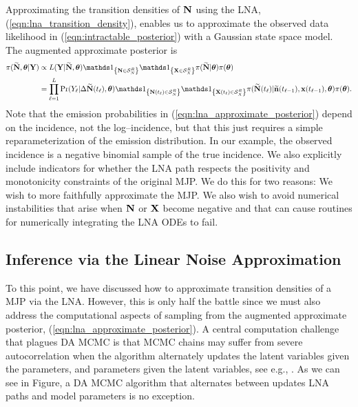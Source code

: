 Approximating the transition densities of $ \mathbf{N} $ using the LNA, (\ref{eqn:lna_transition_density}), enables us to approximate the observed data likelihood in (\ref{eqn:intractable_posterior}) with a Gaussian state space model. The augmented approximate posterior is
\begin{align}
\label{eqn:lna_approximate_posterior}
\pi(\bNtil,\btheta|\bY) &\propto L(\bY|\bNtil,\btheta)\ind{\bN\in\mcS_N^R}\ind{\bX\in\mcS_X^R}\pi(\bNtil|\btheta)\pi(\btheta) \nonumber\\
&= \prod_{\ell=1}^{L}\Pr(Y_\ell|\Delta\bNtil(t_\ell),\btheta)\ind{\bN(t_\ell)\in\mcS_N^R}\ind{\bX(t_\ell)\in\mcS_X^R}\pi(\bNtil(t_\ell)|\bntil(t_{\ell-1}),\bx(t_{\ell-1}),\btheta)\pi(\btheta).
\end{align}
Note that the emission probabilities in (\ref{eqn:lna_approximate_posterior}) depend on the incidence, not the log--incidence, but that this just requires a simple reparameterization of the emission distribution. In our example, the observed incidence is a negative binomial sample of the true incidence. We also explicitly include indicators for whether the LNA path respects the positivity and monotonicity constraints of the original MJP. We do this for two reasons: We wish to more faithfully approximate the MJP. We also wish to avoid numerical instabilities that arise when $ \mathbf{N} $ or $ \mathbf{X} $ become negative and that can cause routines for numerically integrating the LNA ODEs to fail. 

\subsection{Inference via the Linear Noise Approximation}
\label{subsec:lna_inference}

To this point, we have discussed how to approximate transition densities of a MJP via the LNA. However, this is only half the battle since we must also address the computational aspects of sampling from the augmented approximate posterior, (\ref{eqn:lna_approximate_posterior}). A central computation challenge that plagues DA MCMC is that MCMC chains may suffer from severe autocorrelation when the algorithm alternately updates the latent variables given the parameters, and parameters given the latent variables, see e.g., \cite{bernardo2003non,papaspiliopoulos2003noncentered,papaspiliopoulos2007general,yu2011center}. As we can see in Figure, a DA MCMC algorithm that alternates between updates LNA paths and model parameters is no exception.

